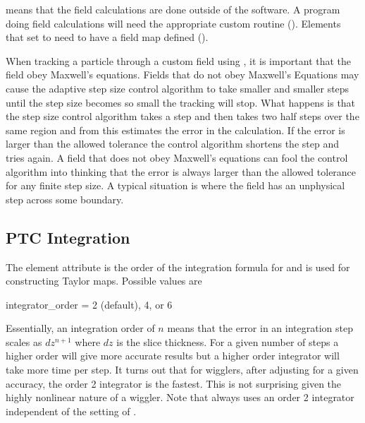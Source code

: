  means that the field calculations are done outside of the \bmad software. A program
doing  field calculations will need the appropriate custom routine ().
Elements that set  to  need to have a field map defined
().

 When tracking a particle through a custom field using , it is
important that the field obey Maxwell's equations. Fields that do not obey Maxwell's Equations may
cause the  adaptive step size control algorithm to take smaller and smaller steps
until the step size becomes so small the tracking will stop. What happens is that the step size
control algorithm takes a step and then takes two half steps over the same region and from this
estimates the error in the calculation. If the error is larger than the allowed tolerance the
control algorithm shortens the step and tries again. A field that does not obey Maxwell's equations
can fool the control algorithm into thinking that the error is always larger than the allowed
tolerance for any finite step size. A typical situation is where the field has an unphysical step
across some boundary.

\subsection{PTC Integration}
\label{s:ptc.integ}

The  element attribute is the order of the integration formula for
 and is used for constructing Taylor maps. Possible values are
\begin{example}
  integrator_order = 2 (default), 4, or 6
\end{example}
Essentially, an integration order of $n$ means that the error in an integration step scales as
$dz^{n+1}$ where $dz$ is the slice thickness.  For a given number of steps a higher order will give
more accurate results but a higher order integrator will take more time per step. It turns out that
for wigglers, after adjusting  for a given accuracy, the order 2 integrator is the
fastest. This is not surprising given the highly nonlinear nature of a wiggler. Note that
 always uses an order 2 integrator independent of the setting of
.

